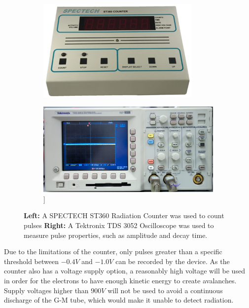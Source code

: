 \documentclass[a4paper]{article}
\begin{document}
  \begin{figure}[h]
  \centering
  \begin{subfigure}[h]{0.4\linewidth}
  \includegraphics[width=\linewidth]{Counter.png}
  \end{subfigure}
  \begin{subfigure}[h]{0.4\linewidth}
  \includegraphics[width=\linewidth]{oscilloscope.jpg}]
  \end{subfigure}
  \caption{\textbf{Left:}  A SPECTECH ST360 Radiation Counter was used to     count pulses 
  \textbf{Right:} A Tektronix TDS 3052 Oscilloscope was used to measure pulse properties, such as amplitude and decay time.}
  \end{figure}
  Due to the limitations of the counter, only pulses greater than a specific threshold between $-0.4V$ and $-1.0V$ can be recorded by the device. As the counter also has a voltage supply option, a reasonably high voltage will be used in order for the electrons to have enough kinetic energy to create avalanches. Supply voltages higher than $900V$ will not be used to avoid a continuous discharge of the G-M tube, which would make it unable to detect radiation.
  
\end{document}
